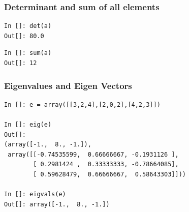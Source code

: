 \documentclass[14pt,compress]{beamer}
\newcounter{time}
\newcommand{\inctime}[1]{\addtocounter{time}{#1}{\tiny \thetime\ m}}
\begin{document}
\begin{frame}[fragile]
\frametitle{Determinant and sum of all elements}
\begin{lstlisting}
In []: det(a)
Out[]: 80.0
\end{lstlisting}
  \begin{lstlisting}
In []: sum(a)
Out[]: 12
  \end{lstlisting}

\end{frame}

\begin{frame}[fragile]
\frametitle{Eigenvalues and Eigen Vectors}
\begin{small}
\begin{lstlisting}
In []: e = array([[3,2,4],[2,0,2],[4,2,3]])

In []: eig(e)
Out[]: 
(array([-1.,  8., -1.]),
 array([[-0.74535599,  0.66666667, -0.1931126 ],
        [ 0.2981424 ,  0.33333333, -0.78664085],
        [ 0.59628479,  0.66666667,  0.58643303]]))

In []: eigvals(e)
Out[]: array([-1.,  8., -1.])
\end{lstlisting}
\end{small}
\end{frame}


\end{document}
